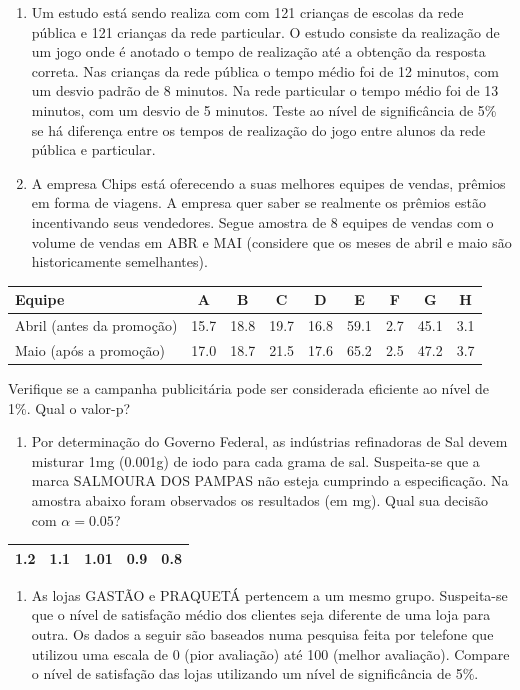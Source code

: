 \documentclass[
]{book}
\providecommand{\tightlist}{%
  \setlength{\itemsep}{0pt}\setlength{\parskip}{0pt}}
\theoremstyle{definition}
\theoremstyle{definition}
\theoremstyle{definition}
\theoremstyle{remark}
\begin{document}
\begin{enumerate}
\def\labelenumi{\arabic{enumi}.}
\setcounter{enumi}{11}
\item
  Um estudo está sendo realiza com com 121 crianças de escolas da rede pública e 121 crianças da rede particular. O estudo consiste da realização de um jogo onde é anotado o tempo de realização até a obtenção da resposta correta. Nas crianças da rede pública o tempo médio foi de 12 minutos, com um desvio padrão de 8 minutos. Na rede particular o tempo médio foi de 13 minutos, com um desvio de 5 minutos. Teste ao nível de significância de 5\% se há diferença entre os tempos de realização do jogo entre alunos da rede pública e particular.
\item
  A empresa Chips está oferecendo a suas melhores equipes de vendas, prêmios em forma de viagens. A empresa quer saber se realmente os prêmios estão incentivando seus vendedores. Segue amostra de 8 equipes de vendas com o volume de vendas em ABR e MAI (considere que os meses de abril e maio são historicamente semelhantes).
\end{enumerate}

\begin{longtable}[]{@{}lcccccccc@{}}
\toprule
Equipe & A & B & C & D & E & F & G & H\tabularnewline
\midrule
\endhead
Abril (antes da promoção) & 15.7 & 18.8 & 19.7 & 16.8 & 59.1 & 2.7 & 45.1 & 3.1\tabularnewline
Maio (após a promoção) & 17.0 & 18.7 & 21.5 & 17.6 & 65.2 & 2.5 & 47.2 & 3.7\tabularnewline
\bottomrule
\end{longtable}

Verifique se a campanha publicitária pode ser considerada eficiente ao nível de 1\%. Qual o valor-p?

\begin{enumerate}
\def\labelenumi{\arabic{enumi}.}
\setcounter{enumi}{13}
\tightlist
\item
  Por determinação do Governo Federal, as indústrias refinadoras de Sal devem misturar 1mg (0.001g) de iodo para cada grama de sal. Suspeita-se que a marca SALMOURA DOS PAMPAS não esteja cumprindo a especificação. Na amostra abaixo foram observados os resultados (em mg). Qual sua decisão com \(\alpha=0.05\)?
\end{enumerate}

\begin{longtable}[]{@{}ccccc@{}}
\toprule
1.2 & 1.1 & 1.01 & 0.9 & 0.8\tabularnewline
\midrule
\endhead
\bottomrule
\end{longtable}

\begin{enumerate}
\def\labelenumi{\arabic{enumi}.}
\setcounter{enumi}{14}
\tightlist
\item
  As lojas GASTÃO e PRAQUETÁ pertencem a um mesmo grupo. Suspeita-se que o nível de satisfação médio dos clientes seja diferente de uma loja para outra. Os dados a seguir são baseados numa pesquisa feita por telefone que utilizou uma escala de 0 (pior avaliação) até 100 (melhor avaliação). Compare o nível de satisfação das lojas utilizando um nível de significância de 5\%.
\end{enumerate}
\end{document}
